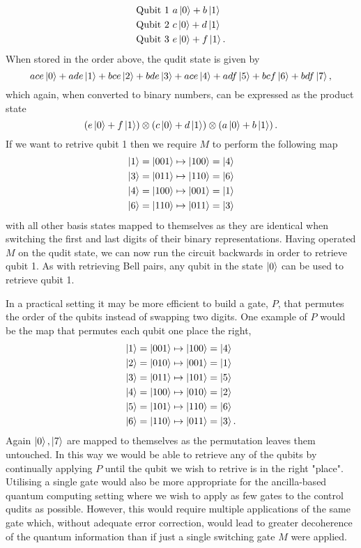 \begin{align*}
    \text{Qubit 1 } &a\ket{0} + b\ket{1}\\
    \text{Qubit 2 } &c\ket{0} + d\ket{1}\\
    \text{Qubit 3 } &e\ket{0} + f\ket{1}.
\end{align*}
When stored in the order above, the qudit state is given by
\begin{equation}
    ace\ket{0} + ade\ket{1} + bce\ket{2} + bde\ket{3} + ace\ket{4} + adf\ket{5} + bcf\ket{6} + bdf\ket{7},
\end{equation}
which again, when converted to binary numbers, can be expressed as the product state
\begin{equation}
    \left(e\ket{0} + f\ket{1}\right) \otimes \left(c\ket{0} + d\ket{1}\right) \otimes \left(a\ket{0} + b\ket{1}\right).
\end{equation}
If we want to retrive qubit 1 then we require $M$ to perform the following map
\begin{align}
    \ket{1} = \ket{001} &\mapsto \ket{100} = \ket{4}\\
    \ket{3} = \ket{011} &\mapsto \ket{110} = \ket{6}\\
    \ket{4} = \ket{100} &\mapsto \ket{001} = \ket{1}\\
    \ket{6} = \ket{110} &\mapsto \ket{011} = \ket{3}
\end{align}
with all other basis states mapped to themselves as they are identical when switching the first and last digits of their binary representations.
Having operated $M$ on the qudit state, we can now run the circuit backwards in order to retrieve qubit 1. As with retrieving Bell pairs, any qubit in the state $\ket{0}$ can be used to retrieve qubit 1.

In a practical setting it may be more efficient to build a gate, $P$, that permutes the order of the qubits instead of swapping two digits.
One example of $P$ would be the map that permutes each qubit one place the right,
\begin{align}
    \ket{1} = \ket{001} &\mapsto \ket{100} = \ket{4}\\
    \ket{2} = \ket{010} &\mapsto \ket{001} = \ket{1}\\
    \ket{3} = \ket{011} &\mapsto \ket{101} = \ket{5}\\
    \ket{4} = \ket{100} &\mapsto \ket{010} = \ket{2}\\
    \ket{5} = \ket{101} &\mapsto \ket{110} = \ket{6}\\
    \ket{6} = \ket{110} &\mapsto \ket{011} = \ket{3}.
\end{align}
Again $\ket{0}, \ket{7}$ are mapped to themselves as the permutation leaves them untouched.
In this way we would be able to retrieve any of the qubits by continually applying $P$ until the qubit we wish to retrive is in the right "place".
Utilising a single gate would also be more appropriate for the ancilla-based quantum computing setting where we wish to apply as few gates to the control qudits as possible.
However, this would require multiple applications of the same gate which, without adequate error correction, would lead to greater decoherence of the quantum information than if just a single switching gate $M$ were applied.